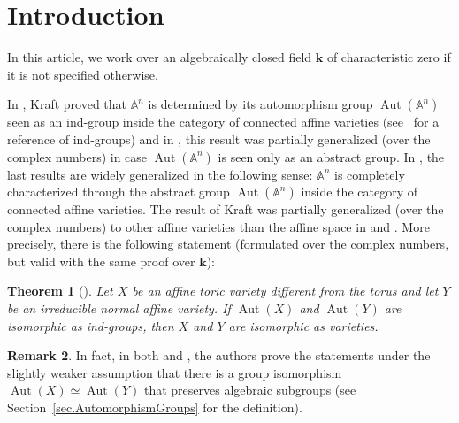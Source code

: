 \documentclass[JEP,XML,SOM,Unicode]{cedram}
\theoremstyle{plain}
\newtheorem{introtheorem}{Theorem}
\theoremstyle{definition}
\newtheorem{introremark}[introtheorem]{Remark}
\DeclareMathOperator{\Aut}{Aut}
\renewcommand{\AA}{\mathbb{A}}
\newcommand{\kk}{{\boldsymbol{k}}}
\newcommand{\name}[1]{#1}
\begin{document}
\maketitle
\tableofcontents
\mainmatter

\section{Introduction}

In this article, we work over an algebraically closed field $\kk$ of characteristic zero
if it is not specified
otherwise.

In \cite[Th.\,1.1]{Kraft2017}, \name{Kraft} proved
that $\mathbb{A}^n$ is determined by
its automorphism group $\Aut(\AA^n)$ seen as an ind-group
inside the category of connected affine varieties
(see~\cite{FuKr2018On-the-geometry-of} for a reference of ind-groups) and in \cite[Main Th.]{KrReSa2018Is-the-affine-spac},
this result was partially generalized (over the complex numbers)
in case $\Aut(\AA^n)$ is seen only as an abstract group.
In \cite[Th.\,A]{CaReXi2019Families-of-Commut},
the last results are widely generalized in the following sense:
$\AA^n$ is completely characterized through the abstract group
$\Aut(\AA^n)$ inside the category of connected affine varieties.
The result of \name{Kraft} was partially generalized (over the complex numbers) to other affine varieties
than the affine space in \cite{Re2017Characterization-o} and \cite{LiReUr2018Characterization-o}.
More precisely, there is the following statement
(formulated over the complex numbers, but valid with the same proof over $\kk$):

\begin{introtheorem}[{\cite[Th.\,1.4]{LiReUr2018Characterization-o}}]
\label{theorem0}
Let $X$ be an affine toric variety different from the torus
and let $Y$ be an irreducible normal affine variety. If $\Aut(X)$ and $\Aut(Y)$ are isomorphic
as ind-groups, then $X$ and $Y$ are isomorphic as varieties.
\end{introtheorem}

\begin{introremark}
\label{rem.Theorem0}
In fact, in both \cite{Kraft2017} and \cite[Th.\,1.4]{LiReUr2018Characterization-o}, the
authors prove the statements under the slightly weaker assumption
that there is a group isomorphism $\Aut(X) \simeq \Aut(Y)$
that preserves algebraic subgroups (see Section~\ref{sec.AutomorphismGroups} for the definition).
\end{introremark}
\end{document}
